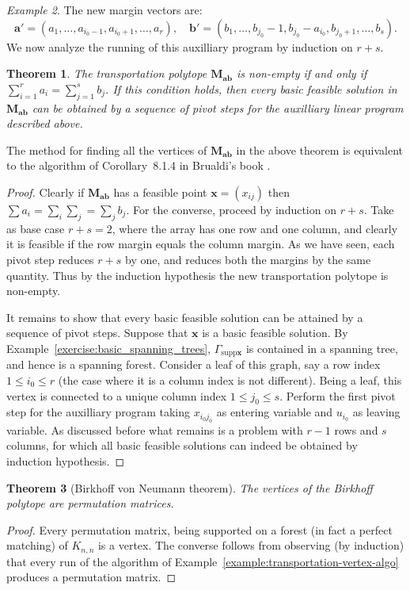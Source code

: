 \documentclass{amsbook}
\newcommand{\xx}{\mathbf x}
\newcommand{\bb}{\mathbf b}
\renewcommand{\aa}{\mathbf a}
\newcommand{\supp}{\mathrm{supp}}
\newcommand{\MM}{\mathbf M}
\newtheorem{theorem}{Theorem}[section]
\theoremstyle{definition}
\theoremstyle{remark}
\newtheorem{example}[theorem]{Example}
\begin{document}
\begin{example}
  The new margin vectors are:
  \begin{displaymath}
    \aa' = (a_1,\dotsc,a_{i_0-1},a_{i_0+1},\dotsc,a_r),\quad \bb'=(b_1,\dotsc,b_{j_0}-1,b_{j_0}-a_{i_0},b_{j_0+1},\dotsc,b_s).
  \end{displaymath}
  We now analyze the running of this auxilliary program by induction on $r+s$.
  \begin{theorem}
    \label{theorem:brualdi-algo}
    The transportation polytope $\MM_{\aa\bb}$ is non-empty if and only if $\sum_{i=1}^r a_i=\sum_{j=1}^s b_j$.
    If this condition holds, then every basic feasible solution in $\MM_{\aa\bb}$ can be obtained by a sequence of pivot steps for the auxilliary linear program described above.
  \end{theorem}
  The method for finding all the vertices of $\MM_{\aa\bb}$ in the above theorem is equivalent to the algorithm of Corollary~8.1.4 in Brualdi's book \cite{Brualdi}. 
  \begin{proof}
    Clearly if $\MM_{\aa\bb}$ has a feasible point $\xx=(x_{ij})$ then $\sum a_i=\sum_i\sum_j=\sum_jb_j$.
    For the converse, proceed by induction on $r+s$.
    Take as base case $r+s=2$, where the array has one row and one column, and clearly it is feasible if the row margin equals the column margin.
    As we have seen, each pivot step reduces $r+s$ by one, and reduces both the margins by the same quantity.
    Thus by the induction hypothesis the new transportation polytope is non-empty.

    It remains to show that every basic feasible solution can be attained by a sequence of pivot steps.
    Suppose that $\xx$ is a basic feasible solution.
    By Example~\ref{exercise:basic_spanning_trees}, $\Gamma_{\supp\xx}$ is contained in a spanning tree, and hence is a spanning forest.
    Consider a leaf of this graph, say a row index $1\leq i_0\leq r$ (the case where it is a column index is not different).
    Being a leaf, this vertex is connected to a unique column index $1\leq j_0\leq s$.
    Perform the first pivot step for the auxilliary program taking $x_{i_0j_0}$ as entering variable and $u_{i_0}$ as leaving variable.
    As discussed before what remains is a problem with $r-1$ rows and $s$ columns, for which all basic feasible solutions can indeed be obtained by induction hypothesis.
  \end{proof}
\end{example}  
\begin{theorem}
  [Birkhoff von Neumann theorem]
  The vertices of the Birkhoff polytope are permutation matrices.
\end{theorem}
\begin{proof}
  Every permutation matrix, being supported on a forest (in fact a perfect matching) of $K_{n,n}$ is a vertex.
  The converse follows from observing (by induction) that every run of the algorithm of Example~\ref{example:transportation-vertex-algo} produces a permutation matrix.
\end{proof}
\end{document}
